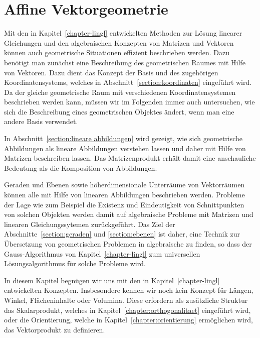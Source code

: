 %
%
%
\chapter{Affine Vektorgeometrie\label{chapter:affin}}
\rhead{}
Mit den in Kapitel~\ref{chapter-lingl} entwickelten Methoden zur Lösung
linearer Gleichungen und den algebraischen Konzepten von Matrizen und Vektoren
können auch geometrische Situationen effizient beschrieben werden.
Dazu benötigt man zunächst eine Beschreibung des geometrischen Raumes
mit Hilfe von Vektoren.
Dazu dient das Konzept der Basis und des zugehörigen Koordinatensystems,
welches in Abschnitt~\ref{section:koordinaten} eingeführt wird.
Da der gleiche geometrische Raum mit verschiedenen Koordinatensystemen
beschrieben werden kann, müssen wir im Folgenden immer auch untersuchen,
wie sich die Beschreibung eines geometrischen Objektes ändert, wenn man
eine andere Basis verwendet.

In Abschnitt~\ref{section:lineare abbildungen} wird gezeigt, wie sich
geometrische Abbildungen als lineare Abbildungen verstehen lassen und
daher mit Hilfe von Matrizen beschreiben lassen.
Das Matrizenprodukt erhält damit eine anschauliche Bedeutung als die
Komposition von Abbildungen.

Geraden und Ebenen sowie höherdimensionale Unterräume von Vektorräumen
können alle mit Hilfe von linearen Abbildungen beschrieben werden.
Probleme der Lage wie zum Beispiel die Existenz und Eindeutigkeit von
Schnittpunkten von solchen Objekten werden damit auf algebraische Probleme
mit Matrizen und linearen Gleichungssytemen zurückgeführt.
Das Ziel der Abschnitte~\ref{section:geraden} und \ref{section:ebenen}
ist daher, eine Technik
zur Übersetzung von geometrischen Problemen in algebraische zu finden,
so dass der Gauss-Algorithmus von Kapitel~\ref{chapter-lingl} zum universellen
Lösungsalgorithmus für solche Probleme wird.

In diesem Kapitel begnügen wir uns mit den in Kapitel~\ref{chapter-lingl}
entwickelten Konzepten.
Insbesondere kennen wir noch kein Konzept für Längen, Winkel,
Flächeninhalte oder Volumina.
Diese erfordern als zusätzliche Struktur das Skalarprodukt, welches in
Kapitel~\ref{chapter:orthogonalitaet} eingeführt wird, oder die Orientierung,
welche in Kapitel~\ref{chapter:orientierung} ermöglichen wird,
das Vektorprodukt zu definieren.






